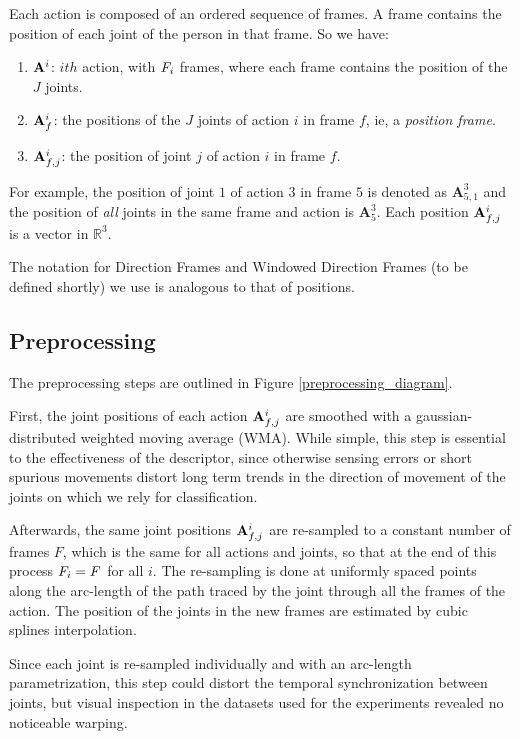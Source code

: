 \documentclass{fcs}
\begin{document}
Each action is composed of an ordered sequence of frames. A frame contains the position of each joint of the person in that frame. So we have:
\begin{enumerate}
\item $\mathbf{A}^i$: $ith$ action, with $F_i$ frames, where each frame contains the position of the $J$ joints.
\item $\mathbf{A}_f^i$: the positions of the $J$ joints of action $i$ in frame $f$, ie, a \textit{position frame}.
\item $\mathbf{A}_{f,j}^i$: the position of joint $j$ of action $i$ in frame $f$.
\end{enumerate}

For example, the position of joint $1$ of action $3$ in frame $5$ is denoted as $\mathbf{A}_{5,1}^3$ and the position of \textit{all} joints in the same frame and action is $\mathbf{A}_{5}^3$. Each position $\mathbf{A}_{f,j}^i$ is a vector in $\mathbb{R}^3$.

The notation for Direction Frames and Windowed Direction Frames (to be defined shortly) we use is analogous to that of positions.



\subsection{Preprocessing}

The preprocessing steps are outlined in Figure \ref{preprocessing_diagram}.

First, the joint positions of each action $\mathbf{A}_{f,j}^i$ are smoothed with a gaussian-distributed weighted moving average (WMA). While simple, this step is essential to the effectiveness of the descriptor, since otherwise sensing errors or short spurious movements distort long term trends in the direction of movement of the joints on which we rely for classification.

Afterwards, the same joint positions $\mathbf{A}_{f,j}^i$ are re-sampled to a constant number of frames $F$, which is the same for all actions and joints, so that at the end of this process $F_i=F$ for all $i$. The re-sampling is done at uniformly spaced points along the arc-length of the path traced by the joint through all the frames of the action. The position of the joints in the new frames are estimated by cubic splines interpolation. 

Since each joint is re-sampled individually and with an arc-length parametrization, this step could distort the temporal synchronization between joints, but visual inspection in the datasets used for the experiments revealed no noticeable warping.
\end{document}

